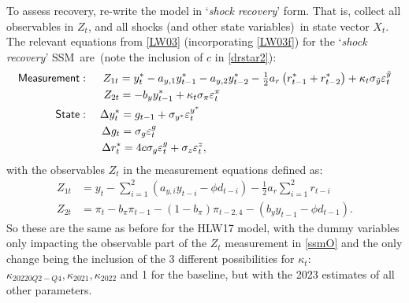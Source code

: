\documentclass[a4paper,12pt]{article}
\newcommand{\bsq}{\begin{subequations}}\newcommand{\esq}{\end{subequations}}
\newcommand{\vsp}[1]{\vspace*{#1mm}}\newcommand{\hsp}[1]{\hspace*{#1mm}}  }
\begin{document}
To assess recovery, re-write the model in `\emph{shock recovery}' form. That
is, collect all observables in $Z_{t}$, and all shocks (and other state
variables)\ in state vector $X_{t}$. The relevant equations from \ref{LW03}
(incorporating \ref{LW03f}) for the `\emph{shock recovery}' SSM\ are\ (note
the inclusion of $c$ in \ref{drstar2}):\bsq\label{ssm0}%
\begin{align}
\mathsf{Measurement}& :\;\quad Z_{1t}=y_{t}^{\ast }-a_{y,1}y_{t-1}^{\ast
}-a_{y,2}y_{t-2}^{\ast }-\tfrac{1}{2}a_{r}\left( r_{t-1}^{\ast
}+r_{t-2}^{\ast }\right) +\kappa _{t}\sigma _{\tilde{y}}\varepsilon _{t}^{%
\tilde{y}} \\
\phantom{\mathsf{Measurement}}& \,\,\;\;\phantom{:\quad}%
Z_{2t}=-b_{y}y_{t-1}^{\ast }+\kappa _{t}\sigma _{\pi }\varepsilon _{t}^{\pi }
\\
\mathsf{State}& :\quad \Delta y_{t}^{\ast }=g_{t-1}+\sigma _{y^{\ast
}}\varepsilon _{t}^{y^{\ast }} \\
\phantom{\mathsf{State}}& \;\,\;\phantom{:\quad}\Delta g_{t}=\sigma
_{g}\varepsilon _{t}^{g} \\
\phantom{\mathsf{State}}& \;\,\;\phantom{:\quad}\Delta r_{t}^{\ast
}=4c\sigma _{g}\varepsilon _{t}^{g}+\sigma _{z}\varepsilon _{t}^{z},
\label{drstar2}
\end{align}%
\esq with the observables $Z_{t}$ in the measurement equations defined as:%
\vsp{-3}\bsq\label{ssmO} 
\begin{align}
Z_{1t}& =y_{t}-\sum_{i=1}^{2}(a_{y,i}y_{t-i}-\phi d_{t-i})-\tfrac{1}{2}%
a_{r}\sum_{i=1}^{2}r_{t-i} \\
Z_{2t}& =\pi _{t}-b_{\pi }\pi _{t-1}-(1-b_{\pi })\pi
_{t-2,4}-(b_{y}y_{t-1}-\phi d_{t-1}).
\end{align}%
\esq So these are the same as before for the HLW17 model, with the dummy
variables only impacting the observable part of the $Z_{t}$ measurement in %
\ref{ssmO} and the only change being the inclusion of the 3 different
possibilities for $\kappa _{t}$: $\kappa _{20220Q2-Q4},\kappa _{2021},\kappa
_{2022}$ and 1 for the baseline, but with the 2023 estimates of all other
parameters.
\end{document}

